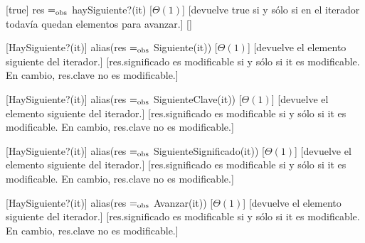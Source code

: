 \begin{Interfaz}
  [true]
  {res $=_{\mathrm{obs}}$ haySiguiente?(it)}
  [$\Theta(1)$]
  [devuelve true si y sólo si en el iterador todavía quedan elementos para avanzar.]
  []

  [HaySiguiente?(it)]
  {alias(res $=_{\mathrm{obs}}$ Siguiente(it))}
  [$\Theta(1)$]
  [devuelve el elemento siguiente del iterador.]
  [res.significado es modificable si y sólo si it es modificable. En cambio, res.clave no es modificable.]
  
  [HaySiguiente?(it)]
  {alias(res $=_{\mathrm{obs}}$ SiguienteClave(it))}
  [$\Theta(1)$]
  [devuelve el elemento siguiente del iterador.]
  [res.significado es modificable si y sólo si it es modificable. En cambio, res.clave no es modificable.]
  
  [HaySiguiente?(it)]
  {alias(res $=_{\mathrm{obs}}$ SiguienteSignificado(it))}
  [$\Theta(1)$]
  [devuelve el elemento siguiente del iterador.]
  [res.significado es modificable si y sólo si it es modificable. En cambio, res.clave no es modificable.]
  
  [HaySiguiente?(it)]
  {alias(res $=_{\mathrm{obs}}$ Avanzar(it))}
  [$\Theta(1)$]
  [devuelve el elemento siguiente del iterador.]
  [res.significado es modificable si y sólo si it es modificable. En cambio, res.clave no es modificable.]


\end{Interfaz}

